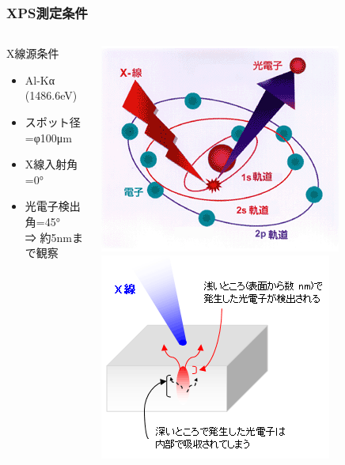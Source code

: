 \documentclass[unicode,12pt]{beamer}%
\begin{document}
\begin{frame}\frametitle{XPS測定条件}
	\begin{columns}[c, onlytextwidth]
			\begin{block}{X線源条件}
				\begin{itemize}
					\item Al-Kα (1486.6eV)
					\item スポット径=φ100μm
					\item X線入射角=0°
					\item 光電子検出角=45° \\⇒ 約5nmまで観察
				\end{itemize}
			\end{block}
			\centering
			\includegraphics[width=.7\textwidth]{XPS_Genri_1.png}
			\vspace{3mm}
			\includegraphics[width=.7\textwidth]{XPS_Genri_3.png}
	\end{columns}
\end{frame}
	
\end{document}
